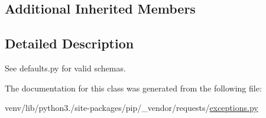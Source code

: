 \subsection*{Additional Inherited Members}


\subsection{Detailed Description}
\begin{DoxyVerb}See defaults.py for valid schemas.\end{DoxyVerb}
 

The documentation for this class was generated from the following file\+:\begin{DoxyCompactItemize}
\item 
venv/lib/python3./site-\/packages/pip/\+\_\+vendor/requests/\hyperlink{pip_2__vendor_2requests_2exceptions_8py}{exceptions.\+py}\end{DoxyCompactItemize}
